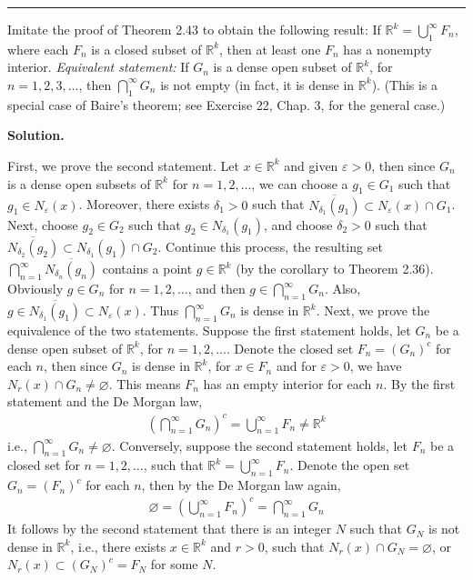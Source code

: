 \documentclass[12pt]{article}
\theoremstyle{definition}
\begin{document}
\bigskip\noindent\hrule\bigskip

Imitate the proof of Theorem 2.43 to obtain the following result:
If $\mathbb{R}^k=\bigcup_{1}^\infty F_n$, where each $F_n$ is a closed subset of $\mathbb{R}^k$, then at least one $F_n$ has a nonempty interior.
\textit{Equivalent statement:} If $G_n$ is a dense open subset of $\mathbb{R}^k$, for $n=1,2,3,\ldots$, then $\bigcap_{1}^\infty G_n$ is not empty (in fact, it is dense in $\mathbb{R}^k$).
(This is a special case of Baire's theorem; see Exercise 22, Chap. 3, for the general case.)

\smallskip
\noindent\textbf{Solution.}\quad

First, we prove the second statement. Let $x\in \mathbb{R}^k$ and given $\varepsilon>0$, then since $G_n$ is a dense open subsets of $\mathbb{R}^k$ for $n=1,2,\ldots$, we can choose a $g_1\in G_1$ such that $g_1\in N_{\varepsilon}(x)$. Moreover, there exists $\delta_1>0$ such that $\overline{N_{\delta_1}(g_1)}\subset N_{\varepsilon}(x)\cap G_1$. Next, choose $g_2\in G_2$ such that $g_2\in N_{\delta_1}(g_1)$, and choose $\delta_2>0$ such that $\overline{N_{\delta_2}(g_2)}\subset N_{\delta_1}(g_1)\cap G_2$. Continue this process, the resulting set $\bigcap_{n=1}^\infty\overline{N_{\delta_n}(g_n)}$ contains a point $g\in \mathbb{R}^k$ (by the corollary to Theorem 2.36). Obviously $g\in G_n$ for $n=1,2,\ldots$, and then $g\in\bigcap_{n=1}^\infty G_n$. Also, $g\in\overline{N_{\delta_1}(g_1)}\subset N_\varepsilon(x)$. Thus $\bigcap_{n=1}^\infty G_n$ is dense in $\mathbb{R}^k$.
Next, we prove the equivalence of the two statements. Suppose the first statement holds, let $G_n$ be a dense open subset of $\mathbb{R}^k$, for $n=1,2,\ldots$. Denote the closed set $F_n=(G_n)^c$ for each $n$, then since $G_n$ is dense in $\mathbb{R}^k$, for $x\in F_n$ and for $\varepsilon>0$, we have $N_r(x)\cap G_n\ne\varnothing$. This means $F_n$ has an empty interior for each $n$. By the first statement and the De Morgan law,
\begin{align*}
\left(\bigcap_{n=1}^\infty G_n\right)^c=\bigcup_{n=1}^\infty F_n\ne \mathbb{R}^k
\end{align*}
i.e., $\bigcap_{n=1}^\infty G_n\ne\varnothing$. Conversely, suppose the second statement holds, let $F_n$ be a closed set for $n=1,2,\ldots$, such that $\mathbb{R}^k=\bigcup_{n=1}^\infty F_n$. Denote the open set $G_n=(F_n)^c$ for each $n$, then by the De Morgan law again,
\begin{align*}
\varnothing
=\left(\bigcup_{n=1}^\infty F_n\right)^c
=\bigcap_{n=1}^\infty G_n
\end{align*}
It follows by the second statement that there is an integer $N$ such that $G_N$ is not dense in $\mathbb{R}^k$, i.e., there exists $x\in \mathbb{R}^k$ and $r>0$, such that $N_r(x)\cap G_N=\varnothing$, or $N_r(x)\subset (G_N)^c=F_N$ for some $N$.
\end{document}
